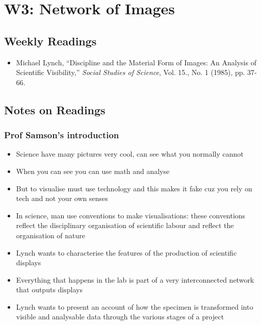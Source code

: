 \documentclass[a4paper]{article}
\begin{document}
\newpage
\section{W3: Network of Images}
\subsection*{Weekly Readings}
\begin{itemize}
	\item Michael Lynch, ``Discipline and the Material Form of Images: An Analysis of Scientific
	Visibility,'' \textit{Social Studies of Science}, Vol. 15., No. 1 (1985), pp. 37-66.
\end{itemize}

\subsection{Notes on Readings}
\subsubsection{Prof Samson's introduction}
\begin{itemize}
	\item Science have many pictures very cool, can see what you normally cannot
	\item When you can see you can use math and analyse
	\item But to visualise must use technology and this makes it fake cuz you rely on tech and not your own senses
	\item In science, man use conventions to make visualisations: these conventions reflect the disciplinary organisation of scientific labour and reflect the organisation of nature
	\item Lynch wants to characterise the features of the production of scientific displays
	\item Everything that happens in the lab is part of a very interconnected network that outputs displays
	\item Lynch wants to present an account of how the specimen is transformed into visible and analysable data through the various stages of a project
\end{itemize}
\end{document}
